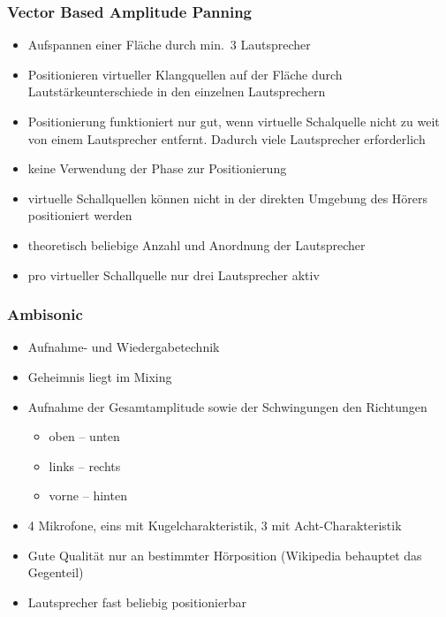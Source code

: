 \documentclass[a4paper, 12pt]{article}
\begin{document}
\subsubsection*{Vector Based Amplitude Panning}
\begin{itemize}
  \item Aufspannen einer Fläche durch min.\ 3 Lautsprecher
  \item Positionieren virtueller Klangquellen auf der Fläche durch Lautstärkeunterschiede in den einzelnen Lautsprechern
\end{itemize}
\begin{itemize}
  \renewcommand{\labelitemi}{\(-\)}%
  \item Positionierung funktioniert nur gut, wenn virtuelle Schalquelle nicht zu weit von einem Lautsprecher entfernt. Dadurch viele Lautsprecher erforderlich
  \item keine Verwendung der Phase zur Positionierung
  \item virtuelle Schallquellen können nicht in der direkten Umgebung des Hörers positioniert werden
\end{itemize}
\begin{itemize}
  \renewcommand{\labelitemi}{+}%
  \item theoretisch beliebige Anzahl und Anordnung der Lautsprecher
  \item pro virtueller Schallquelle nur drei Lautsprecher aktiv
\end{itemize}

\subsubsection*{Ambisonic}
\begin{itemize}
  \item Aufnahme- und Wiedergabetechnik
  \item Geheimnis liegt im Mixing
  \item Aufnahme der Gesamtamplitude sowie der Schwingungen den Richtungen
    \begin {itemize}
      \item oben -- unten
      \item links -- rechts
      \item vorne -- hinten
    \end{itemize}
  \item 4 Mikrofone, eins mit Kugelcharakteristik, 3 mit Acht-Charakteristik
\end{itemize}
\begin{itemize}
  \renewcommand{\labelitemi}{\(-\)}%
  \item Gute Qualität nur an bestimmter Hörposition (Wikipedia behauptet das Gegenteil)
\end{itemize}
\begin{itemize}
  \renewcommand{\labelitemi}{+}%
  \item Lautsprecher fast beliebig positionierbar
\end{itemize}
\end{document}
